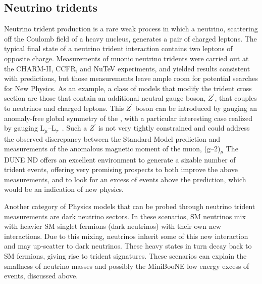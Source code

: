 \subsection{Neutrino tridents}
 Neutrino trident production is a rare weak process in which a neutrino, scattering off the Coulomb
 field of a heavy nucleus, generates a pair of charged leptons. The typical final state of a neutrino
 trident interaction contains two leptons of opposite charge. Measurements of muonic neutrino
 tridents were carried out at the CHARM-II, CCFR, and NuTeV experiments, and yielded results
 consistent with  predictions, but those measurements leave ample room for 
 potential searches for New Physics. As an example, a class of models that modify the trident cross
 section are those that contain an additional neutral gauge boson, $Z^\prime$, 
 that couples to neutrinos and charged leptons. This $Z^\prime$
 boson can be introduced by gauging an anomaly-free global symmetry
of the , with a particular interesting case realized by gauging L$_{\mu}$--L$_{\tau}$~\cite{He:1990pn,He:1991qd}. Such a $Z^\prime$
 is not very tightly constrained and could address~\cite{Baek:2001kca,Harigaya:2013twa} the observed discrepancy between the Standard
Model prediction and measurements of the anomalous magnetic moment of the muon, (g--2)$_{\mu}$
 The DUNE ND offers an excellent environment to generate a sizable number of trident events,
  offering very promising prospects to both improve the above measurements, and to
 look for an excess of events above the  prediction, which would be an 
  indication of new physics. 
  
  
  Another category of  Physics
 models that can be probed through neutrino trident measurements are dark neutrino sectors. In
 these scenarios, SM neutrinos mix with heavier SM singlet fermions (dark neutrinos) with their
 own new interactions. Due to this mixing, neutrinos inherit some of this new interaction and may
 up-scatter to dark neutrinos. These heavy states in turn decay back to SM fermions, giving rise
 to trident signatures. These scenarios can explain the smallness of neutrino masses and possibly
 the MiniBooNE low energy excess of events, discussed above.

